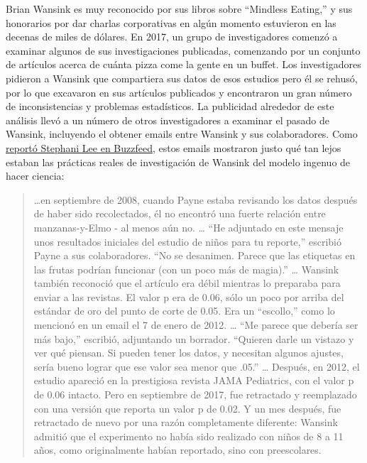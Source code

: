 \documentclass[
  12pt,
]{book}
\begin{document}
Brian Wansink es muy reconocido por sus libros sobre ``Mindless Eating,'' y sus honorarios por dar charlas corporativas en algún momento estuvieron en las decenas de miles de dólares. En 2017, un grupo de investigadores comenzó a examinar algunos de sus investigaciones publicadas, comenzando por un conjunto de artículos acerca de cuánta pizza come la gente en un buffet. Los investigadores pidieron a Wansink que compartiera sus datos de esos estudios pero él se rehusó, por lo que excavaron en sus artículos publicados y encontraron un gran número de inconsistencias y problemas estadísticos. La publicidad alrededor de este análisis llevó a un número de otros investigadores a examinar el pasado de Wansink, incluyendo el obtener emails entre Wansink y sus colaboradores. Como \href{https://www.buzzfeednews.com/article/stephaniemlee/brian-wansink-cornell-p-hacking}{reportó Stephani Lee en Buzzfeed}, estos emails mostraron justo qué tan lejos estaban las prácticas reales de investigación de Wansink del modelo ingenuo de hacer ciencia:

\begin{quote}
\ldots en septiembre de 2008, cuando Payne estaba revisando los datos después de haber sido recolectados, él no encontró una fuerte relación entre manzanas-y-Elmo - al menos aún no. \ldots{}
``He adjuntado en este mensaje unos resultados iniciales del estudio de niños para tu reporte,'' escribió Payne a sus colaboradores. ``No se desanimen. Parece que las etiquetas en las frutas podrían funcionar (con un poco más de magia).'' \ldots{}
Wansink también reconoció que el artículo era débil mientras lo preparaba para enviar a las revistas. El valor p era de 0.06, sólo un poco por arriba del estándar de oro del punto de corte de 0.05. Era un ``escollo,'' como lo mencionó en un email el 7 de enero de 2012. \ldots{}
``Me parece que debería ser más bajo,'' escribió, adjuntando un borrador. ``Quieren darle un vistazo y ver qué piensan. Si pueden tener los datos, y necesitan algunos ajustes, sería bueno lograr que ese valor sea menor que .05.'' \ldots{}
Después, en 2012, el estudio apareció en la prestigiosa revista JAMA Pediatrics, con el valor p de 0.06 intacto. Pero en septiembre de 2017, fue retractado y reemplazado con una versión que reporta un valor p de 0.02. Y un mes después, fue retractado de nuevo por una razón completamente diferente: Wansink admitió que el experimento no había sido realizado con niños de 8 a 11 años, como originalmente habían reportado, sino con preescolares.
\end{quote}
\end{document}
